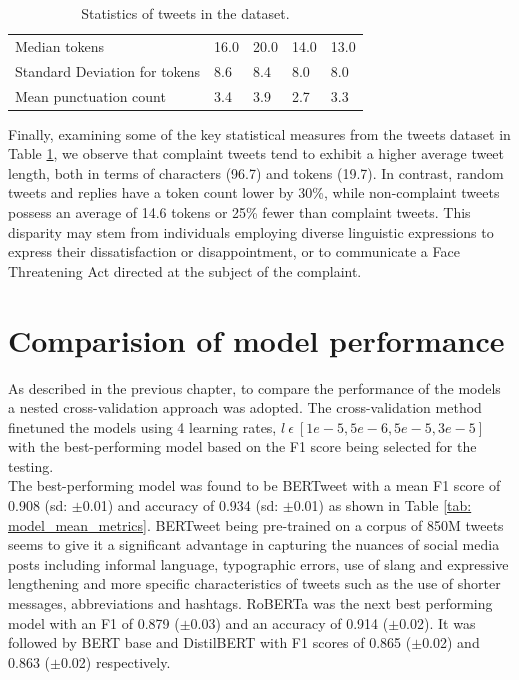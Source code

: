 \begin{table}[htbp]
\begin{tabularx}{\textwidth}{|l|X|X|X|X|}
        \rowcolor[gray]{0.9}
        Median tokens                   & 16.0                & 20.0                & 14.0                    & 13.0            \\
        Standard Deviation for tokens   & 8.6                 & 8.4                 & 8.0                     & 8.0             \\
        \hline
        \hline
        Mean punctuation count          & 3.4                 & 3.9                 & 2.7                     & 3.3             \\
        \hline
    \end{tabularx}
    \caption{Statistics of tweets in the dataset.}
    \label{tab: tweets_statistics}
\end{table}

Finally, examining some of the key statistical measures from the tweets dataset in Table \ref{tab: tweets_statistics}, we observe that complaint tweets tend to exhibit a higher average tweet length, both in terms of characters (96.7) and tokens (19.7). In contrast, random tweets and replies have a token count lower by 30\%, while non-complaint tweets possess an average of 14.6 tokens or 25\% fewer than complaint tweets. This disparity may stem from individuals employing diverse linguistic expressions to express their dissatisfaction or disappointment, or to communicate a Face Threatening Act directed at the subject of the complaint.

\section{Comparision of model performance}
As described in the previous chapter, to compare the performance of the models a nested cross-validation approach was adopted. The cross-validation method finetuned the models using 4 learning rates, $l\:\epsilon\:[1e-5, 5e-6, 5e-5, 3e-5]$ with the best-performing model based on the F1 score being selected for the testing. \\

The best-performing model was found to be BERTweet with a mean F1 score of 0.908 (sd: $\pm$0.01) and accuracy of 0.934 (sd: $\pm$0.01) as shown in Table \ref{tab: model_mean_metrics}. BERTweet being pre-trained on a corpus of 850M tweets seems to give it a significant advantage in capturing the nuances of social media posts including informal language, typographic errors, use of slang and expressive lengthening and more specific characteristics of tweets such as the use of shorter messages, abbreviations and hashtags. RoBERTa was the next best performing model with an F1 of 0.879 ($\pm$0.03) and an accuracy of 0.914 ($\pm$0.02). It was followed by BERT base and DistilBERT with F1 scores of 0.865 ($\pm$0.02) and 0.863 ($\pm$0.02) respectively. \\

